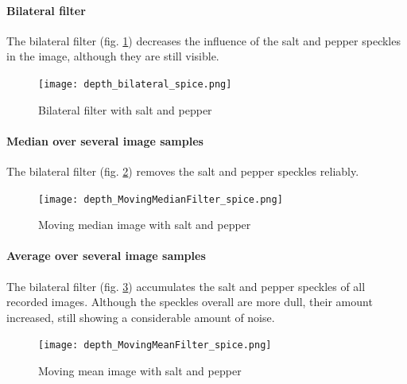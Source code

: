 \documentclass[DIV12,a4paper]{scrartcl}
\begin{document}
\paragraph{Bilateral filter}
The bilateral filter (fig. \ref{fig:bilateral_depth_spice}) decreases the influence of the salt and pepper speckles in the image, although they are still visible.
\begin{figure}[!htbp]
  \centering
  \texttt{[image: depth\_bilateral\_spice.png]}
  \caption{Bilateral filter with salt and pepper}
  \label{fig:bilateral_depth_spice}
\end{figure}
\paragraph{Median over several image samples}
The bilateral filter (fig. \ref{fig:moving_median_depth_spice}) removes the salt and pepper speckles reliably.
\begin{figure}[!htbp]
  \centering
  \texttt{[image: depth\_MovingMedianFilter\_spice.png]}
  \caption{Moving median image with salt and pepper}
  \label{fig:moving_median_depth_spice}
\end{figure}
\paragraph{Average over several image samples}
The bilateral filter (fig. \ref{fig:moving_mean_depth_spice}) accumulates the salt and pepper speckles of all recorded images. Although the speckles overall are more dull, their amount increased, still showing a considerable amount of noise.
\begin{figure}[!htbp]
  \centering
  \texttt{[image: depth\_MovingMeanFilter\_spice.png]}
  \caption{Moving mean image with salt and pepper}
  \label{fig:moving_mean_depth_spice}
\end{figure}
\end{document}
